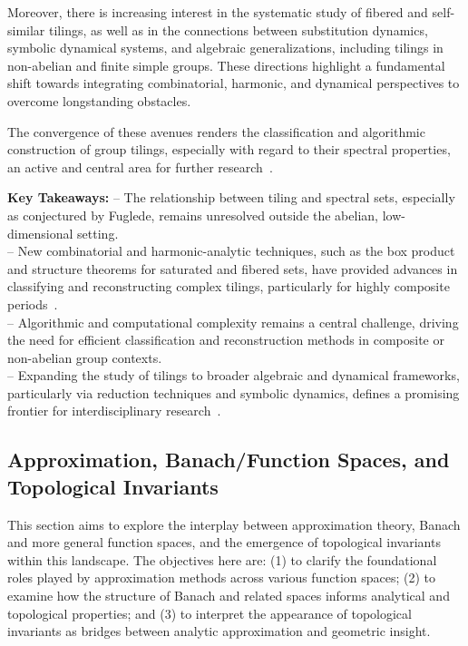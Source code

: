 \documentclass[sigconf]{acmart}
\begin{document}
Moreover, there is increasing interest in the systematic study of fibered and self-similar tilings, as well as in the connections between substitution dynamics, symbolic dynamical systems, and algebraic generalizations, including tilings in non-abelian and finite simple groups. These directions highlight a fundamental shift towards integrating combinatorial, harmonic, and dynamical perspectives to overcome longstanding obstacles.

The convergence of these avenues renders the classification and algorithmic construction of group tilings, especially with regard to their spectral properties, an active and central area for further research~\cite{ref101}.

\vspace{0.5em}
\noindent
\textbf{Key Takeaways:}
\newline
-- The relationship between tiling and spectral sets, especially as conjectured by Fuglede, remains unresolved outside the abelian, low-dimensional setting.\\
-- New combinatorial and harmonic-analytic techniques, such as the box product and structure theorems for saturated and fibered sets, have provided advances in classifying and reconstructing complex tilings, particularly for highly composite periods~\cite{ref101}.\\
-- Algorithmic and computational complexity remains a central challenge, driving the need for efficient classification and reconstruction methods in composite or non-abelian group contexts.\\
-- Expanding the study of tilings to broader algebraic and dynamical frameworks, particularly via reduction techniques and symbolic dynamics, defines a promising frontier for interdisciplinary research~\cite{ref101}.

\subsection{Approximation, Banach/Function Spaces, and Topological Invariants}

This section aims to explore the interplay between approximation theory, Banach and more general function spaces, and the emergence of topological invariants within this landscape. The objectives here are: (1) to clarify the foundational roles played by approximation methods across various function spaces; (2) to examine how the structure of Banach and related spaces informs analytical and topological properties; and (3) to interpret the appearance of topological invariants as bridges between analytic approximation and geometric insight.
\end{document}
